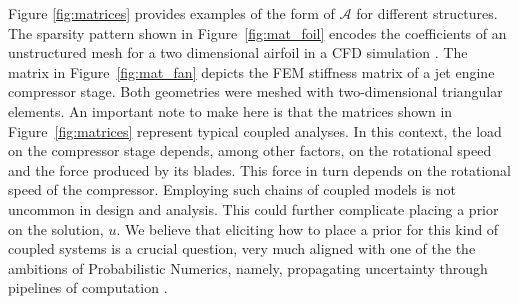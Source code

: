 \documentclass[twoside]{article}
\begin{document}
		Figure \ref{fig:matrices} provides examples of the form of $\mathcal{A}$ for different structures. The sparsity pattern shown in Figure~\ref{fig:mat_foil} encodes the coefficients of an unstructured mesh for a two dimensional airfoil in a CFD simulation \cite{Davis:2011}. The matrix in Figure~\ref{fig:mat_fan} depicts the FEM stiffness matrix of a jet engine compressor stage. Both geometries were meshed with two-dimensional triangular elements. An important note to make here is that the matrices shown in Figure~\ref{fig:matrices} represent typical coupled analyses. In this context, the load on the compressor stage depends, among other factors, on the rotational speed and the force produced by its blades. This force in turn depends on the rotational speed of the compressor. %
		Employing such chains of coupled models is not uncommon in design and analysis. This could further complicate placing a prior on the solution, $u$. We believe that eliciting how to place a prior for this kind of coupled systems is a crucial question, very much aligned with one of the the ambitions of Probabilistic Numerics, namely, propagating uncertainty through pipelines of computation \cite{PN15}.
\end{document}
